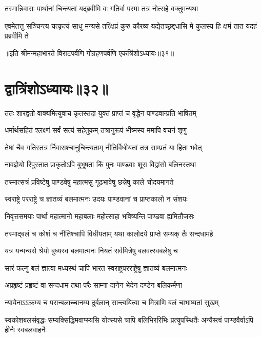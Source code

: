 \twolineshloka
{तस्मान्निवासः पार्थानां चिन्त्यतां यद्ब्रवीमि वः}
{गतिर्वा परमा तत्र नोत्सहे वक्तुमन्यथा}


\threelineshloka
{एवमेतत्तु सञ्चिन्त्य यत्कृत्यं साधु मन्यसे}
{तत्क्षिप्रं कुरु कौरव्य यद्येतच्छ्रद्दधासि मे}
{कुलस्य हि क्षमं तात यदहं प्रब्रवीमि ते}

॥इति श्रीमन्महाभारते विराटपर्वणि गोग्रहणपर्वणि एकत्रिंशोऽध्यायः॥३१॥

\chapter{द्वात्रिंशोऽध्यायः॥३२॥}

\twolineshloka
{ततः शारद्वतो वाक्यमित्युवाच कृतस्तदा}
{युक्तं प्राप्तं च वृद्धेन पाण्डवान्प्रति भाषितम्}


\twolineshloka
{धर्मार्थसहितं श्लक्ष्णं सर्वं सत्यं सहेतुकम्}
{तत्रानुरूपं भीष्मस्य ममापि वचनं शृणु}


\twolineshloka
{तेषां चैव गतिस्तत्र र्निवासश्चानुचिन्त्यताम्}
{नीतिर्विधीयतां तत्र साम्प्रतं या हिता भवेत्}


\twolineshloka
{नावज्ञेयो रिपुस्तात प्राकृतोऽपि बुभूषता}
{किं पुनः पाण्डवाः शूरा विद्वांसो बलिनस्तथा}


\twolineshloka
{तस्मात्सत्रं प्रविष्टेषु पाण्डवेषु महात्मसु}
{गूढभावेषु छन्नेषु काले चोदयमागते}


\twolineshloka
{स्वराष्ट्रे परराष्ट्रे च ज्ञातव्यं बलमात्मनः}
{उदयः पाण्डवानां च प्राप्तकालो न संशयः}


\twolineshloka
{निवृत्तसमयाः पार्था महात्मानो महाबलाः}
{महोत्साहा भविष्यन्ति पाण्डवा ह्यमितौजसः}


\twolineshloka
{तस्माद्बलं च कोशं च नीतिश्चापि विधीयताम्}
{यथा कालोदये प्राप्ते सम्यक् तैः सन्दधामहे}


\twolineshloka
{यत्र यन्मन्यसे श्रेयो बुध्यस्व बलमात्मनः}
{नियतं सर्वमित्रेषु बलवत्स्वबलेषु च}


\twolineshloka
{सारं फल्गु बलं ज्ञात्वा मध्यस्थं चापि भारत}
{स्वराष्ट्रपरराष्ट्रेषु ज्ञातव्यं बलमात्मनः}


\twolineshloka
{अप्रहृष्टं प्रहृष्टं वा सन्दधाम तथा परैः}
{साम्ना दानेन भेदेन दण्डेन बलिकर्मणा}


\twolineshloka
{न्यायेनाऽऽक्रम्य च परान्बलाच्चानम्य दुर्बलान्}
{सान्त्वयित्वा च मित्राणि बलं चाभाष्यतां सुखम्}


\threelineshloka
{स्वकोशबलसंवृद्धः सम्यक्सिद्धिमवाप्स्यसि}
{योत्स्यसे चापि बलिभिररिभिः प्रत्युपस्थितैः}
{अन्यैस्त्वं पाण्डवैर्वाऽपि हीनैः स्वबलवाहनैः}


